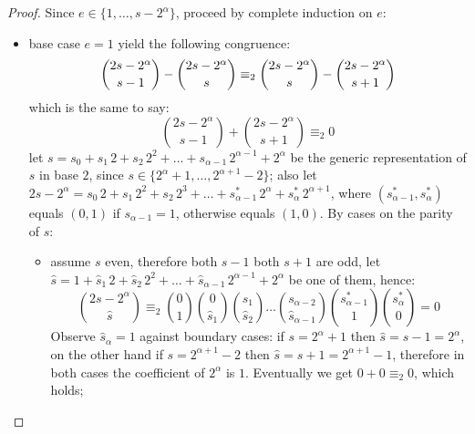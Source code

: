 \begin{proof}
Since $e\in\lbrace1,\ldots,s-2^{{\alpha}}\rbrace$, proceed by complete induction on $e$:
\begin{itemize}
    \item base case $e=1$ yield the following congruence:
        \begin{displaymath}
                {{2s-2^{{\alpha}}}\choose{s-1}}-{{2s-2^{{\alpha}}}\choose{s}}
                \equiv_{2}
                {{2s-2^{{\alpha}}}\choose{s}}-{{2s-2^{{\alpha}}}\choose{s+1}}\\
        \end{displaymath}
        which is the same to say:
        \begin{displaymath}
                {{2s-2^{{\alpha}}}\choose{s-1}}+{{2s-2^{{\alpha}}}\choose{s+1}} \equiv_{2} 0
        \end{displaymath}
        let $s=s_{0}+s_{1}\,2+s_{2}\,2^{2}+\ldots+s_{{\alpha}-1}\,2^{{\alpha}-1} + 2^{{\alpha}}$
        be the generic representation of $s$ in base $2$, since 
        $s\in\lbrace 2^{{\alpha}}+1,\ldots,2^{{\alpha}+1}-2 \rbrace$; also  
        let $2s-2^{{\alpha}}=s_{0}\,2+s_{1}\,2^{2}+s_{2}\,2^{3}+\ldots+s_{{\alpha}-1}^{*}\,2^{{\alpha}} + s_{{\alpha}}^{*}\,2^{{\alpha}+1}$,
        where $(s_{{\alpha}-1}^{*},s_{{\alpha}}^{*})$ equals $(0,1)$ if $s_{{\alpha}-1}=1$, otherwise equals $(1,0)$.
        By cases on the parity of $s$:
        \begin{itemize}
            \item assume $s$ even, therefore both $s-1$ both $s+1$ are odd, 
                let $\hat{s}=1+\hat{s}_{1}\,2+\hat{s}_{2}\,2^{2}+\ldots+
                    \hat{s}_{{\alpha}-1}\,2^{{\alpha}-1}+2^{{\alpha}}$ be one of them, hence:
                \begin{displaymath}
                        {{2s-2^{{\alpha}}}\choose{\hat{s}}}  
                        \equiv_{2}
                        {{0}\choose{1}} 
                        {{0}\choose{\hat{s}_{1}}}
                        {{s_{1}}\choose{\hat{s}_{2}}}
                        \ldots
                        {{s_{{\alpha}-2}}\choose{\hat{s}_{{\alpha}-1}}}
                        {{s_{{\alpha}-1}^{*}}\choose{1}}
                        {{s_{{\alpha}}^{*}}\choose{0}} = 0
                \end{displaymath}
                Observe $\hat{s}_{{\alpha}}=1$ against boundary cases:
                if $s=2^{{\alpha}}+1$ then $\hat{s}=s-1=2^{{\alpha}}$, on the other
                hand if $s=2^{{\alpha}+1}-2$ then $\hat{s}=s+1=2^{{\alpha}+1}-1$,
                therefore in both cases the coefficient of $2^{{\alpha}}$ is $1$.
                Eventually we get $0+0 \equiv_{2}0$, which holds;


\end{itemize}
\end{itemize}
\end{proof}
